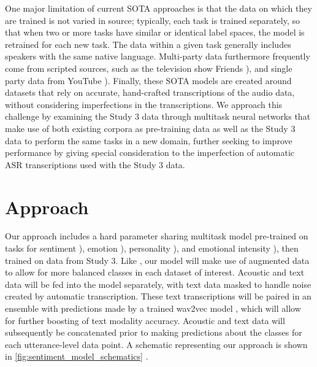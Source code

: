 One major limitation of current SOTA approaches is that the data on which they
are trained is not varied in source; typically, each task is trained
separately, so that when two or more tasks have similar or identical label
spaces, the model is retrained for each new task. The data within a given task
generally includes speakers with the same native language.  Multi-party data
furthermore frequently come from scripted sources, such as the television show
Friends \cite{Poria.ea:2019, Zhu.ea:2021}), and single party data from YouTube
\cite{Zadeh.ea:2016, Ponce-Lopez.ea:2016}). Finally, these SOTA models are
created around datasets that rely on accurate, hand-crafted transcriptions of
the audio data, without considering imperfections in the transcriptions. We
approach this challenge by examining the Study 3 data through multitask neural
networks that make use of both existing corpora as pre-training data as well as
the Study 3 data to perform the same tasks in a new domain, further seeking to
improve performance by giving special consideration to the imperfection of
automatic ASR transcriptions used with the Study 3 data. 


\section{Approach}

Our approach includes a hard parameter sharing multitask model pre-trained on
tasks for sentiment \citep{Zadeh.ea:2016}), emotion \citep{Poria.ea:2019}),
personality \citep{Ponce-Lopez.ea:2016}),
and emotional intensity \citep{Livingstone.ea:2018}), then trained on data from
Study 3. Like \citet{Liu.ea:2021}, our model will make use of augmented data to
allow for more balanced classes in each dataset of interest.  Acoustic and text
data will be fed into the model separately, with text data masked to handle
noise created by automatic transcription. These text transcriptions will be
paired in an ensemble with predictions made by a trained wav2vec model
\citep{Schneider.ea:2019}, which will allow for further boosting of text
modality accuracy. Acoustic and text data will subsequently be concatenated
prior to making predictions about the classes for each utterance-level data
point. A schematic representing our approach is shown in
\autoref{fig:sentiment_model_schematics} . 

